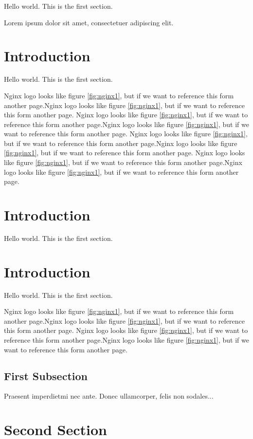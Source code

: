 \documentclass[10pt, a4paper]{article} %
\begin{document}
Hello world. This is the first section.

Lorem ipsum dolor sit amet, consectetuer adipiscing elit.
\section{Introduction}

Hello world. This is the first section.

Nginx logo looks like figure \ref{fig:nginx1}, but if we want to reference this form another page.Nginx logo looks like figure \ref{fig:nginx1}, but if we want to reference this form another page.
Nginx logo looks like figure \ref{fig:nginx1}, but if we want to reference this form another page.Nginx logo looks like figure \ref{fig:nginx1}, but if we want to reference this form another page.
Nginx logo looks like figure \ref{fig:nginx1}, but if we want to reference this form another page.Nginx logo looks like figure \ref{fig:nginx1}, but if we want to reference this form another page.
Nginx logo looks like figure \ref{fig:nginx1}, but if we want to reference this form another page.Nginx logo looks like figure \ref{fig:nginx1}, but if we want to reference this form another page.

\section{Introduction}

Hello world. This is the first section.
\section{Introduction}

Hello world. This is the first section.

Nginx logo looks like figure \ref{fig:nginx1}, but if we want to reference this form another page.Nginx logo looks like figure \ref{fig:nginx1}, but if we want to reference this form another page.
Nginx logo looks like figure \ref{fig:nginx1}, but if we want to reference this form another page.Nginx logo looks like figure \ref{fig:nginx1}, but if we want to reference this form another page.

\subsection{First Subsection}
Praesent imperdietmi nec ante. Donec ullamcorper, felis non sodales...

\section{Second Section}
\end{document}
